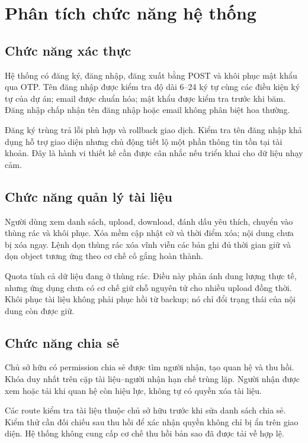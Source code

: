 \section{Phân tích chức năng hệ thống}
\subsection{Chức năng xác thực}
Hệ thống có đăng ký, đăng nhập, đăng xuất bằng POST và khôi phục mật khẩu qua OTP. Tên đăng nhập được kiểm tra độ dài 6--24 ký tự cùng các điều kiện ký tự của dự án; email được chuẩn hóa; mật khẩu được kiểm tra trước khi băm. Đăng nhập chấp nhận tên đăng nhập hoặc email không phân biệt hoa thường.

Đăng ký trùng trả lỗi phù hợp và rollback giao dịch. Kiểm tra tên đăng nhập khả dụng hỗ trợ giao diện nhưng chủ động tiết lộ một phần thông tin tồn tại tài khoản. Đây là hành vi thiết kế cần được cân nhắc nếu triển khai cho dữ liệu nhạy cảm.
\subsection{Chức năng quản lý tài liệu}
Người dùng xem danh sách, upload, download, đánh dấu yêu thích, chuyển vào thùng rác và khôi phục. Xóa mềm cập nhật cờ và thời điểm xóa; nội dung chưa bị xóa ngay. Lệnh dọn thùng rác xóa vĩnh viễn các bản ghi đủ thời gian giữ và dọn object tương ứng theo cơ chế cố gắng hoàn thành.

Quota tính cả dữ liệu đang ở thùng rác. Điều này phản ánh dung lượng thực tế, nhưng ứng dụng chưa có cơ chế giữ chỗ nguyên tử cho nhiều upload đồng thời. Khôi phục tài liệu không phải phục hồi từ backup; nó chỉ đổi trạng thái của nội dung còn được giữ.
\subsection{Chức năng chia sẻ}
Chủ sở hữu có permission chia sẻ được tìm người nhận, tạo quan hệ và thu hồi. Khóa duy nhất trên cặp tài liệu--người nhận hạn chế trùng lặp. Người nhận được xem hoặc tải khi quan hệ còn hiệu lực, không tự có quyền xóa tài liệu.

Các route kiểm tra tài liệu thuộc chủ sở hữu trước khi sửa danh sách chia sẻ. Kiểm thử cần đối chiếu sau thu hồi để xác nhận quyền không chỉ bị ẩn trên giao diện. Hệ thống không cung cấp cơ chế thu hồi bản sao đã được tải về hợp lệ.
